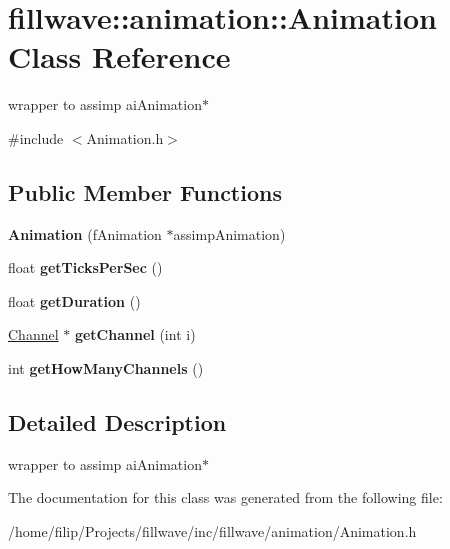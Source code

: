 \hypertarget{classfillwave_1_1animation_1_1Animation}{}\section{fillwave\+:\+:animation\+:\+:Animation Class Reference}
\label{classfillwave_1_1animation_1_1Animation}


wrapper to assimp ai\+Animation$\ast$  




{\ttfamily \#include $<$Animation.\+h$>$}

\subsection*{Public Member Functions}
\begin{DoxyCompactItemize}
\item 
\hypertarget{classfillwave_1_1animation_1_1Animation_ae2471866d6a4f37236736e7dbcf848c9}{}{\bfseries Animation} (f\+Animation $\ast$assimp\+Animation)\label{classfillwave_1_1animation_1_1Animation_ae2471866d6a4f37236736e7dbcf848c9}

\item 
\hypertarget{classfillwave_1_1animation_1_1Animation_a1c7e4af0aa34791b80aff656b0f1a765}{}float {\bfseries get\+Ticks\+Per\+Sec} ()\label{classfillwave_1_1animation_1_1Animation_a1c7e4af0aa34791b80aff656b0f1a765}

\item 
\hypertarget{classfillwave_1_1animation_1_1Animation_a0f744aa753d3f7c1154ac445030b386d}{}float {\bfseries get\+Duration} ()\label{classfillwave_1_1animation_1_1Animation_a0f744aa753d3f7c1154ac445030b386d}

\item 
\hypertarget{classfillwave_1_1animation_1_1Animation_a6af6335f174a9fc658a28d4571862ee3}{}\hyperlink{classfillwave_1_1animation_1_1Channel}{Channel} $\ast$ {\bfseries get\+Channel} (int i)\label{classfillwave_1_1animation_1_1Animation_a6af6335f174a9fc658a28d4571862ee3}

\item 
\hypertarget{classfillwave_1_1animation_1_1Animation_a46c3033d0c97e98bb0c5bb01d683b7fd}{}int {\bfseries get\+How\+Many\+Channels} ()\label{classfillwave_1_1animation_1_1Animation_a46c3033d0c97e98bb0c5bb01d683b7fd}

\end{DoxyCompactItemize}


\subsection{Detailed Description}
wrapper to assimp ai\+Animation$\ast$ 

The documentation for this class was generated from the following file\+:\begin{DoxyCompactItemize}
\item 
/home/filip/\+Projects/fillwave/inc/fillwave/animation/Animation.\+h\end{DoxyCompactItemize}
